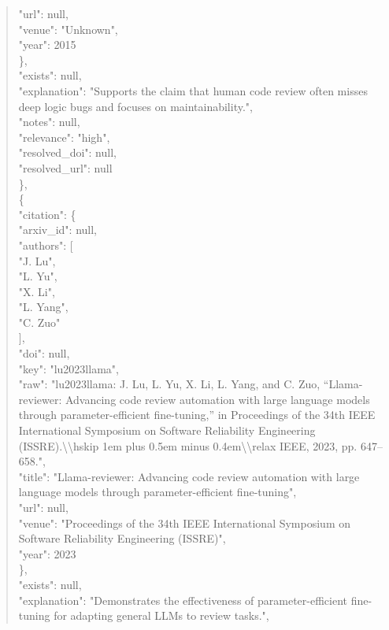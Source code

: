 \documentclass[11pt]{article}
\begin{document}
\begin{quote}
        "url": null,\\
        "venue": "Unknown",\\
        "year": 2015\\
      \},\\
      "exists": null,\\
      "explanation": "Supports the claim that human code review often misses deep logic bugs and focuses on maintainability.",\\
      "notes": null,\\
      "relevance": "high",\\
      "resolved\_doi": null,\\
      "resolved\_url": null\\
    \},\\
    \{\\
      "citation": \{\\
        "arxiv\_id": null,\\
        "authors": [\\
          "J. Lu",\\
          "L. Yu",\\
          "X. Li",\\
          "L. Yang",\\
          "C. Zuo"\\
        ],\\
        "doi": null,\\
        "key": "lu2023llama",\\
        "raw": "lu2023llama: J. Lu, L. Yu, X. Li, L. Yang, and C. Zuo, ``Llama-reviewer: Advancing code review automation with large language models through parameter-efficient fine-tuning,'' in Proceedings of the 34th IEEE International Symposium on Software Reliability Engineering (ISSRE).\textbackslash{}\textbackslash{}hskip 1em plus 0.5em minus 0.4em\textbackslash{}\textbackslash{}relax IEEE, 2023, pp. 647--658.",\\
        "title": "Llama-reviewer: Advancing code review automation with large language models through parameter-efficient fine-tuning",\\
        "url": null,\\
        "venue": "Proceedings of the 34th IEEE International Symposium on Software Reliability Engineering (ISSRE)",\\
        "year": 2023\\
      \},\\
      "exists": null,\\
      "explanation": "Demonstrates the effectiveness of parameter-efficient fine-tuning for adapting general LLMs to review tasks.",\\

\end{quote}
\end{document}
